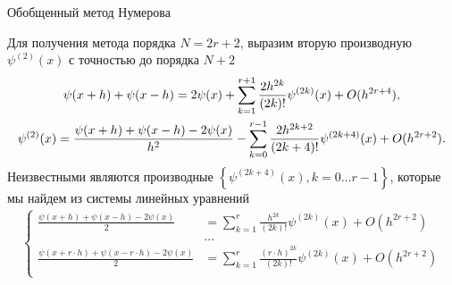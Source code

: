 \documentclass[10pt,pdf,hyperref={unicode},xcolor=dvipsnames]{beamer}
\newcommand{\lc}{\left\{}
\newcommand{\rc}{\right\}}
\newcommand{\psip}[1]{\psi^{(#1)}(x)}
\begin{document}
\begin{frame}{Обобщенный метод Нумерова}
    \begin{block}{}
        \vspace*{-0.5cm}
        Для получения метода порядка $N = 2r + 2$, выразим вторую производную $\psip{2}$ с точностью до порядка $N + 2$ 
        \begin{gather}
            \psi(x+h) + \psi(x-h) = 2 \psi(x) + \sum_{k=1}^{r+1} \frac{ 2h^{2k} }{ (2k)! } \psip{2k} + O(h^{2r+4}), \\
            \psip{2} = \frac{ \psi(x+h) + \psi(x-h) - 2\psi(x) }{ h^2 }  - \sum_{k=0}^{r-1} \frac{ 2h^{2k+2} }{ (2k+4)! } \psip{2k+4} + O(h^{2r+2}). \notag
        \end{gather}
        Неизвестными являются производные $\lc \psip{2k + 4}, k = 0 \dots r-1 \rc$, которые мы найдем из системы линейных уравнений
        \begin{gather}
            \lc
            \begin{aligned}
                \frac{ \psi(x+h) + \psi(x-h) - 2\psi(x) }{ 2 } &= \sum_{k=1}^{r} \frac{ h^{2k} }{ (2k)! } \psip{2k} + O(h^{2r+2}) \\ 
                                                               &\dots \\
                \frac{ \psi(x+r\cdot h) + \psi(x-r \cdot h) - 2\psi(x) }{ 2 } &= \sum_{k=1}^{r} \frac{ (r \cdot h)^{2k} }{ (2k)! } \psip{2k} + O(h^{2r+2}) \\ 
            \end{aligned}
            \right.
        \end{gather}
    \end{block}
\end{frame}
\end{document}
